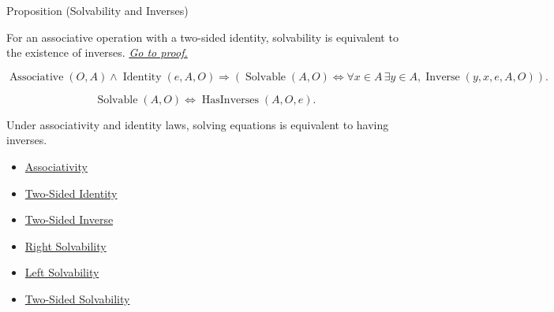 \begin{propositionbox}{Proposition (Solvability and Inverses)}
\begin{proposition}
\label{prop:solvability-iff-inverses}
For an associative operation with a two-sided identity, solvability is
equivalent to the existence of inverses.
\hyperref[prf:solvability-iff-inverses]{\textit{Go to proof.}}
\end{proposition}
\end{propositionbox}

\begin{remark*}
\[
\operatorname{Associative}(O,A)
\land
\operatorname{Identity}(e,A,O)
\Longrightarrow
\left(
\operatorname{Solvable}(A,O)
\Longleftrightarrow
\forall x\in A\,\exists y\in A,\operatorname{Inverse}(y,x,e,A,O)
\right).
\]
\end{remark*}

\begin{remark*}
\[
\operatorname{Solvable}(A,O)
\Longleftrightarrow
\operatorname{HasInverses}(A,O,e).
\]
\end{remark*}

\begin{remark*}[Interpretation]
Under associativity and identity laws, solving equations is equivalent to
having inverses.
\end{remark*}

\begin{dependencies}
\begin{itemize}
  \item \hyperref[def:associativity]{Associativity}
  \item \hyperref[def:two-sided-identity]{Two-Sided Identity}
  \item \hyperref[def:two-sided-inverse]{Two-Sided Inverse}
  \item \hyperref[def:right-solvability]{Right Solvability}
  \item \hyperref[def:left-solvability]{Left Solvability}
  \item \hyperref[def:two-sided-solvability]{Two-Sided Solvability}
\end{itemize}
\end{dependencies}
